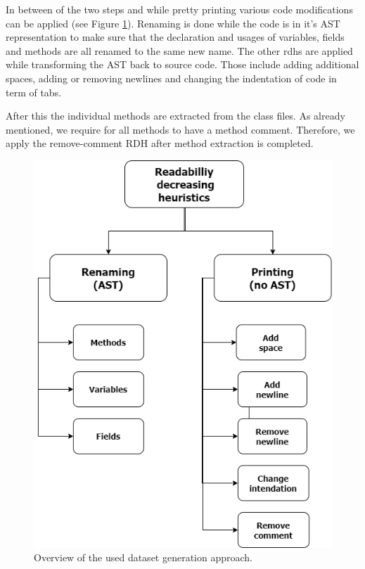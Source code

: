 \documentclass[%
class=scrreprt,
chapterprefix=false,%
open=right,%
twoside=false,%
paper=a4,%
logofile={Logo\_zentral\_farbig\_EN.png},%
thesistype=master,%
UKenglish,%
]{se2thesis}
\begin{document}
	In between of the two steps and while pretty printing various code modifications can be applied (see Figure \ref{fig:rdh}).
	Renaming is done while the code is in it's AST representation to make sure that the declaration and usages of variables, fields and methods are all renamed to the same new name. 
	The other rdhs are applied while transforming the AST back to source code. Those include adding additional spaces, adding or removing newlines and changing the indentation of code in term of tabs.
	
	After this the individual methods are extracted from the class files. As already mentioned, we require for all methods to have a method comment. Therefore, we apply the remove-comment RDH after method extraction is completed.
	
	\begin{figure}[t]
		\centering
		\includegraphics[width=\textwidth]{img/rdh.png}
		\caption{Overview of the used dataset generation approach.}
		\label{fig:rdh}
	\end{figure}
	
\end{document}
